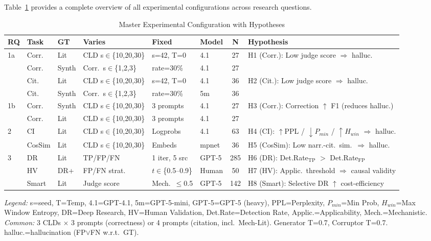 Table~\ref{tab:master} provides a complete overview of all experimental configurations across research questions.

\begin{table}[H]
\centering
\caption{Master Experimental Configuration with Hypotheses}
\label{tab:master}
\scriptsize
\renewcommand{\arraystretch}{1.2}
\begin{tabularx}{\textwidth}{@{}l l l l l l c X@{}}
\toprule
\textbf{RQ} & \textbf{Task} & \textbf{GT} & \textbf{Varies} & \textbf{Fixed} & \textbf{Model} & \textbf{N} & \textbf{Hypothesis} \\
\midrule
\multirow{4}{*}{1a} 
  & Corr. & Lit & CLD s$\in$\{10,20,30\} & s=42, T=0 & 4.1 & 27 & \multirow{2}{*}{H1 (Corr.): Low judge score $\Rightarrow$ halluc.} \\
  & Corr. & Synth & Corr.\ s$\in$\{1,2,3\} & rate=30\% & 4.1 & 27 & \\
  & Cit. & Lit & CLD s$\in$\{10,20,30\} & s=42, T=0 & 4.1 & 36 & \multirow{2}{*}{H2 (Cit.): Low judge score $\Rightarrow$ halluc.} \\
  & Cit. & Synth & Corr.\ s$\in$\{1,2,3\} & rate=30\% & 5m & 36 & \\
\midrule
\multirow{2}{*}{1b}
  & Corr. & Synth & CLD s$\in$\{10,20,30\} & 3 prompts & 4.1 & 27 & \multirow{2}{*}{H3 (Corr.): Correction $\uparrow$ F1 (reduces halluc.)} \\
  & Corr. & Lit & CLD s$\in$\{10,20,30\} & 3 prompts & 4.1 & 27 & \\
\midrule
\multirow{2}{*}{2}
  & CI & Lit & CLD s$\in$\{10,20,30\} & Logprobs & 4.1 & 63 & H4 (CI): $\uparrow$PPL / $\downarrow P_{min}$ / $\uparrow H_{win}$ $\Rightarrow$ halluc. \\
  & CosSim & Lit & CLD s$\in$\{10,20,30\} & Embeds & mpnet & 36 & H5 (CosSim): Low narr.-cit.\ sim.\ $\Rightarrow$ halluc. \\
\midrule
\multirow{3}{*}{3}
  & DR & Lit & TP/FP/FN & 1 iter, 5 src & GPT-5 & 285 & H6 (DR): Det.Rate$_{\text{TP}}$ $>$ Det.Rate$_{\text{FP}}$ \\
  & HV & DR+ & FP/FN strat. & $t\in$\{0.5--0.9\} & Human & 50 & H7 (HV): Applic.\ threshold $\Rightarrow$ causal validity \\
  & Smart & Lit & Judge score & Mech.\ $\leq$0.5 & GPT-5 & 142 & H8 (Smart): Selective DR $\uparrow$ cost-efficiency \\
\bottomrule
\end{tabularx}
\vspace{0.3em}

\scriptsize
\textit{Legend:} s=seed, T=Temp, 4.1=GPT-4.1, 5m=GPT-5-mini, GPT-5=GPT-5 (heavy), PPL=Perplexity, $P_{min}$=Min Prob, $H_{win}$=Max Window Entropy, DR=Deep Research, HV=Human Validation, Det.Rate=Detection Rate, Applic.=Applicability, Mech.=Mechanistic. \\
\textit{Common:} 3 CLDs $\times$ 3 prompts (correctness) or 4 prompts (citation, incl.\ Mech-Lit). Generator T=0.7, Corruptor T=0.7. halluc.=hallucination (FP$\lor$FN w.r.t.\ GT).
\end{table}

